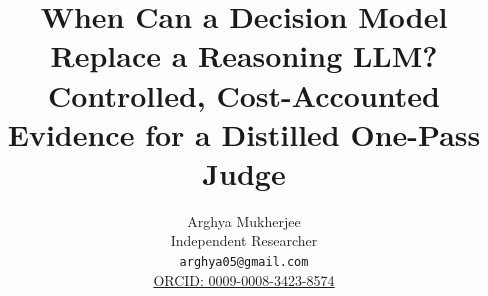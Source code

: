\documentclass{article}
\title{When Can a Decision Model Replace a Reasoning LLM?\\ Controlled, Cost-Accounted Evidence for a Distilled One-Pass Judge}
\author{Arghya Mukherjee\\Independent Researcher\\\texttt{arghya05@gmail.com}\\
\href{https://orcid.org/0009-0008-3423-8574}{ORCID: 0009-0008-3423-8574}}
\begin{document}
\raggedbottom
\maketitle





\FloatBarrier

\FloatBarrier

\FloatBarrier

\FloatBarrier

\FloatBarrier




\appendix


\end{document}

